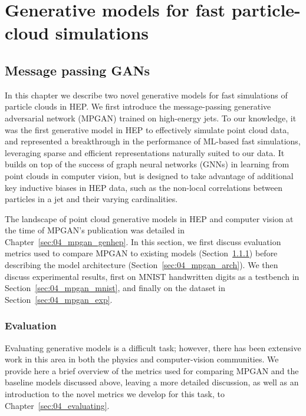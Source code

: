 \chapter{Generative models for fast particle-cloud simulations}
\label{sec:04_models}

\section{Message passing GANs}
\label{sec:04_mpgan}

In this chapter we describe two novel generative models for fast simulations of particle clouds in HEP.
We first introduce the message-passing generative adversarial network (MPGAN) trained on high-energy \jetnet jets.
To our knowledge, it was the first generative model in HEP to effectively simulate point cloud data, and represented a breakthrough in the performance of ML-based fast simulations, leveraging sparse and efficient representations naturally suited to our data.
It builds on top of the success of graph neural networks (GNNs) in learning from point clouds in computer vision, but is designed to take advantage of additional key inductive biases in HEP data, such as the non-local correlations between particles in a jet and their varying cardinalities.

The landscape of point cloud generative models in HEP and computer vision at the time of MPGAN's publication was detailed in Chapter~\ref{sec:04_mpgan_genhep}.
In this section, we first discuss evaluation metrics used to compare MPGAN to existing models (Section~\ref{sec:04_mpgan_geneval}) before describing the model architecture (Section~\ref{sec:04_mpgan_arch}).
We then discuss experimental results, first on MNIST handwritten digits as a testbench in Section~\ref{sec:04_mpgan_mnist}, and finally on the \jetnet dataset in Section~\ref{sec:04_mpgan_exp}.


\subsection{Evaluation}
\label{sec:04_mpgan_geneval}

Evaluating generative models is a difficult task; however, there has been extensive work in this area in both the physics and computer-vision communities.
We provide here a brief overview of the metrics used for comparing MPGAN and the baseline models discussed above, leaving a more detailed discussion, as well as an introduction to the novel metrics we develop for this task, to Chapter~\ref{sec:04_evaluating}.

